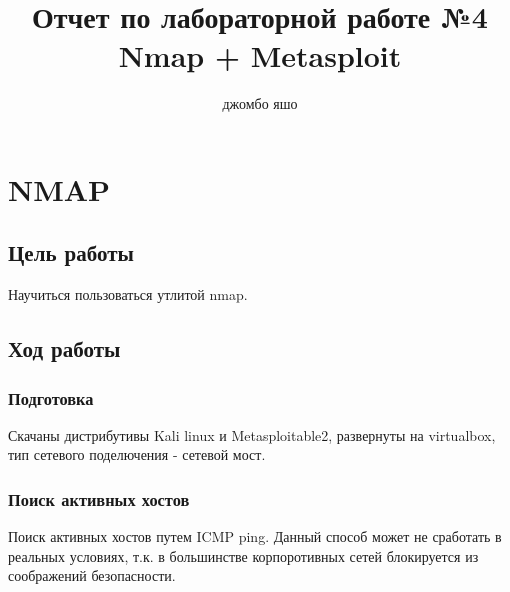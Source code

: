 \documentclass[10pt,a4paper]{article}
\author{джомбо яшо}
\title{Отчет по лабораторной работе №4 Nmap + Metasploit}
\begin{document}
\maketitle

\newpage

\section{NMAP}

\subsection{Цель работы}

Научиться пользоваться утлитой nmap.

\subsection{Ход работы}

\subsubsection{Подготовка}

Скачаны дистрибутивы Kali linux и Metasploitable2, развернуты на virtualbox, тип сетевого поделючения - сетевой мост.

\subsubsection{Поиск активных хостов}

Поиск активных хостов путем ICMP ping. Данный способ может не сработать в реальных условиях, т.к. в большинстве корпоротивных сетей блокируется из соображений безопасности.
\end{document}
